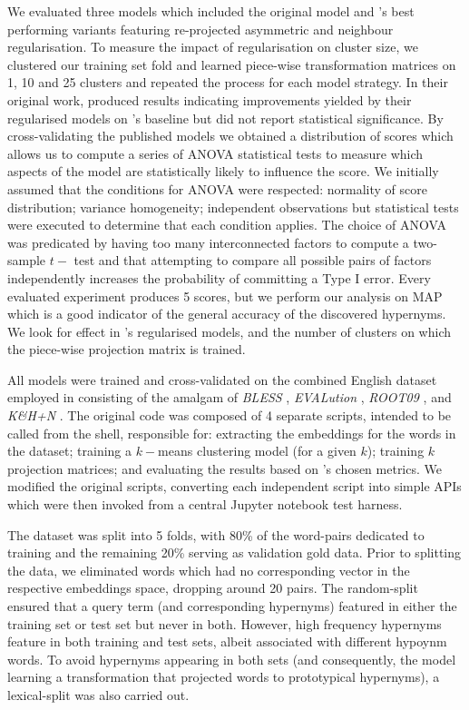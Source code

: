 We evaluated three models which included the original \citep{Fu2014} model and \citeauthor{ustalov2017negative}'s best performing variants featuring re-projected asymmetric and neighbour regularisation.  To measure the impact of regularisation on cluster size, we clustered our training set fold and learned piece-wise transformation matrices on 1, 10 and 25 clusters and repeated the process for each model strategy.  In their original work, \citeauthor{ustalov2017negative} produced results indicating improvements yielded by their regularised models on \citeauthor{Fu2014}'s baseline but did not report statistical significance.  By cross-validating the published models we obtained a distribution of scores which allows us to compute a series of \ac{ANOVA} statistical tests to measure which aspects of the model are statistically likely to influence the score.  We initially assumed that the conditions for \ac{ANOVA} were respected: normality of score distribution; variance homogeneity; independent observations but statistical tests were executed to determine that each condition applies.  The choice of \ac{ANOVA} was predicated by having too many interconnected factors to compute a two-sample $t-$ test and that attempting to compare all possible pairs of factors independently increases the probability of committing a Type I error.  Every evaluated experiment produces 5 scores, but we perform our analysis on \ac{MAP} which is a good indicator of the general accuracy of the discovered hypernyms.  We look for effect in \citeauthor{ustalov2017negative}'s regularised models, and the number of clusters on which the piece-wise projection matrix is trained. 

All models were trained and cross-validated on the combined English dataset employed in \citep{ustalov2017negative} consisting of the amalgam of \textit{BLESS} \citep{Baroni2011}, \textit{EVALution} \citep{santus2015evalution}, \textit{ROOT09} \citep{santus2016nine}, and \textit{K\&H+N} \citep{necsulescu2015reading}.  The original code was composed of 4 separate scripts, intended to be called from the shell, responsible for: extracting the embeddings for the words in the dataset; training a $k-$means clustering model (for a given $k$); training $k$ projection matrices; and evaluating the results based on \citeauthor{ustalov2017negative}'s chosen metrics.  We modified the original scripts, converting each independent script into simple APIs which were then invoked from a central Jupyter notebook test harness.

The dataset was split into 5 folds, with 80\% of the word-pairs dedicated to training and the remaining 20\% serving as validation gold data.  Prior to splitting the data, we eliminated words which had no corresponding vector in the respective embeddings space, dropping around 20 pairs.  The random-split ensured that a query term (and corresponding hypernyms) featured in either the training set or test set but never in both.  However, high frequency hypernyms feature in both training and test sets, albeit associated with different hypoynm words.  To avoid hypernyms appearing in both sets (and consequently, the model learning a transformation that projected words to prototypical hypernyms), a lexical-split was also carried out.

